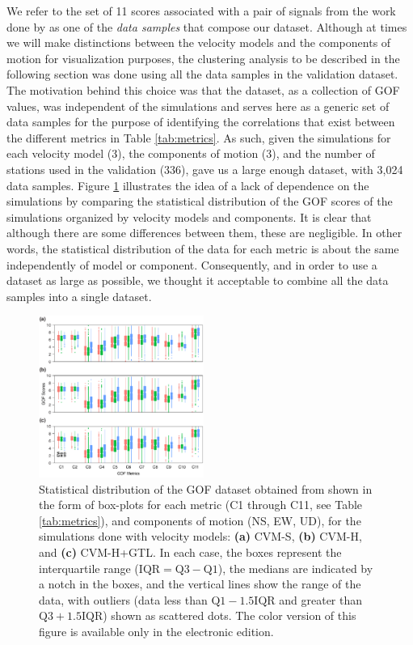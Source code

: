 We refer to the set of 11 scores associated with a pair of signals from the work done by \citet{Taborda_2014_BSSA} as one of the \textit{data samples} that compose our dataset. Although at times we will make distinctions between the velocity models and the components of motion for visualization purposes, the clustering analysis to be described in the following section was done using all the data samples in the validation dataset. The motivation behind this choice was that the dataset, as a collection of GOF values, was independent of the simulations and serves here as a generic set of data samples for the purpose of identifying the correlations that exist between the different metrics in Table \ref{tab:metrics}. As such, given the simulations for each velocity model (3), the components of motion (3), and the number of stations used in the validation (336), gave us a large enough dataset, with 3,024 data samples. Figure \ref{fig:data-box-plot} illustrates the idea of a lack of dependence on the simulations by comparing the statistical distribution of the GOF scores of the simulations organized by velocity models and components. It is clear that although there are some differences between them, these are negligible. In other words, the statistical distribution of the data for each metric is about the same independently of model or component. Consequently, and in order to use a dataset as large as possible, we thought it acceptable to combine all the data samples into a single dataset.

\begin{figure}[ht!]
    \centering
    \includegraphics[width=0.48\textwidth]{figures/pdf/figure-03}
    \caption{Statistical distribution of the GOF dataset obtained from \citet{Taborda_2014_BSSA} shown in the form of box-plots for each metric (C1 through C11, see Table \ref{tab:metrics}), and components of motion (NS, EW, UD), for the simulations done with velocity models: \textbf{(a)} CVM-S, \textbf{(b)} CVM-H, and \textbf{(c)} CVM-H+GTL. In each case, the boxes represent the interquartile range ($\mathrm{IQR} = \mathrm{Q}3 - \mathrm{Q}1$), the medians are indicated by a notch in the boxes, and the vertical lines show the range of the data, with outliers (data less than $\mathrm{Q}1 - 1.5 \mathrm{IQR}$ and greater than $\mathrm{Q}3 + 1.5 \mathrm{IQR}$) shown as scattered dots. The color version of this figure is available only in the electronic edition.}
    \label{fig:data-box-plot}
\end{figure}

